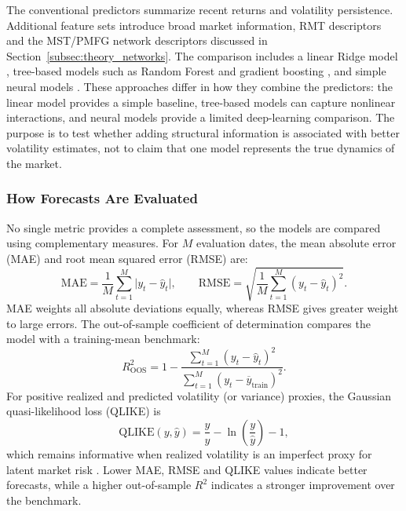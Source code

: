 The conventional predictors summarize recent returns and volatility persistence. Additional feature sets introduce broad market information, RMT descriptors and the MST/PMFG network descriptors discussed in Section~\ref{subsec:theory_networks}. The comparison includes a linear Ridge model \cite{hoerl_kennard_1970_ridge}, tree-based models such as Random Forest and gradient boosting \cite{breiman_2001_random,friedman_2001_greedy}, and simple neural models \cite{bucci_2020_realized,christensen_2022_realized}. These approaches differ in how they combine the predictors: the linear model provides a simple baseline, tree-based models can capture nonlinear interactions, and neural models provide a limited deep-learning comparison. The purpose is to test whether adding structural information is associated with better volatility estimates, not to claim that one model represents the true dynamics of the market.

\subsubsection{How Forecasts Are Evaluated}
No single metric provides a complete assessment, so the models are compared using complementary measures. For $M$ evaluation dates, the mean absolute error (MAE) and root mean squared error (RMSE) are:
\begin{equation}
\mathrm{MAE}=\frac{1}{M}\sum_{t=1}^{M}\lvert y_t-\widehat{y}_t\rvert,
\qquad
\mathrm{RMSE}=\sqrt{\frac{1}{M}\sum_{t=1}^{M}(y_t-\widehat{y}_t)^2}.
\label{eq:theory_mae_rmse}
\end{equation}
MAE weights all absolute deviations equally, whereas RMSE gives greater weight to large errors. The out-of-sample coefficient of determination compares the model with a training-mean benchmark:
\begin{equation}
R_{\mathrm{OOS}}^2 = 1 - \frac{\sum_{t=1}^{M}(y_t-\widehat{y}_t)^2}{\sum_{t=1}^{M}(y_t-\overline{y}_{\mathrm{train}})^2}.
\label{eq:theory_oos_r2}
\end{equation}
For positive realized and predicted volatility (or variance) proxies, the Gaussian quasi-likelihood loss (QLIKE) is
\begin{equation}
\mathrm{QLIKE}(y,\widehat{y}) = \frac{y}{\widehat{y}}-\ln\left(\frac{y}{\widehat{y}}\right)-1,
\label{eq:theory_qlike}
\end{equation}
which remains informative when realized volatility is an imperfect proxy for latent market risk \cite{patton_2011_volatility}. Lower MAE, RMSE and QLIKE values indicate better forecasts, while a higher out-of-sample $R^2$ indicates a stronger improvement over the benchmark.

